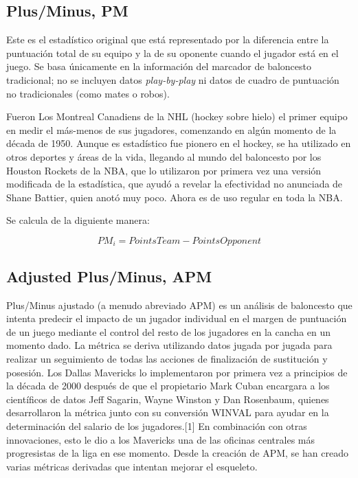 \documentclass[paper=a4, fontsize=9pt]{article}
\begin{document}
\subsection{Plus/Minus, PM}

Este es el estadístico original que está representado por la diferencia entre la puntuación total de su equipo y la de su oponente cuando el jugador está en el juego. Se basa únicamente en la información del marcador de baloncesto tradicional; no se incluyen datos \emph{play-by-play} ni datos de cuadro de puntuación no tradicionales (como mates o robos).

Fueron Los Montreal Canadiens de la NHL (hockey sobre hielo) el primer equipo en medir el más-menos de sus jugadores, comenzando en algún momento de la década de 1950. Aunque es estadístico fue pionero en el hockey, se ha utilizado en otros deportes y áreas de la vida, llegando al mundo del baloncesto por los Houston Rockets de la NBA, que lo utilizaron por primera vez una versión modificada de la estadística, que ayudó a revelar la efectividad no anunciada de Shane Battier, quien anotó muy poco. Ahora es de uso regular en toda la NBA. 

Se calcula de la diguiente manera:

$$PM_i = PointsTeam - PointsOpponent$$

\subsection{Adjusted Plus/Minus, APM}

Plus/Minus ajustado (a menudo abreviado APM) es un análisis de baloncesto que intenta predecir el impacto de un jugador individual en el margen de puntuación de un juego mediante el control del resto de los jugadores en la cancha en un momento dado. La métrica se deriva utilizando datos jugada por jugada para realizar un seguimiento de todas las acciones de finalización de sustitución y posesión. Los Dallas Mavericks lo implementaron por primera vez a principios de la década de 2000 después de que el propietario Mark Cuban encargara a los científicos de datos Jeff Sagarin, Wayne Winston y Dan Rosenbaum, quienes desarrollaron la métrica junto con su conversión WINVAL para ayudar en la determinación del salario de los jugadores.[1] En combinación con otras innovaciones, esto le dio a los Mavericks una de las oficinas centrales más progresistas de la liga en ese momento. Desde la creación de APM, se han creado varias métricas derivadas que intentan mejorar el esqueleto.
\end{document}
